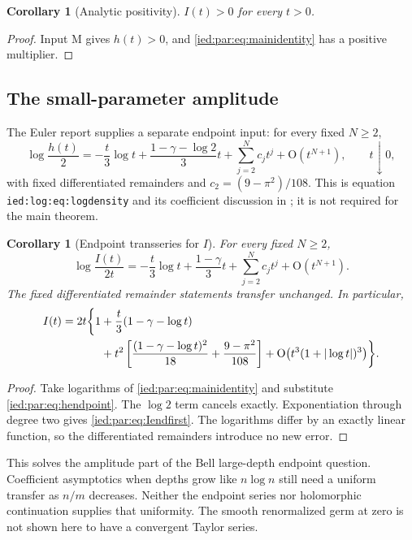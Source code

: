 \documentclass[11pt,letterpaper]{article}
\newtheorem{corollary}[theorem]{Corollary}
\theoremstyle{remark}\newtheorem{remark}[theorem]{Remark}
\newcommand{\Oh}{\mathrm O}\newcommand{\supp}{\operatorname{supp}}
\newcommand{\file}[1]{\nolinkurl{#1}}
\begin{document}
\begin{corollary}[Analytic positivity]\label{ied:par:cor:positive}
$I(t)>0$ for every $t>0$.
\end{corollary}
\begin{proof}
Input M gives $h(t)>0$, and \eqref{ied:par:eq:mainidentity} has a positive multiplier.
\end{proof}

\subsection{The small-parameter amplitude}
The Euler report supplies a separate endpoint input: for every fixed
$N\ge2$,
\begin{equation}\label{ied:par:eq:hendpoint}
 \log\frac{h(t)}2
 =-\frac t3\log t+\frac{1-\gamma-\log2}{3}t
 +\sum_{j=2}^N c_jt^j+\Oh(t^{N+1}),\qquad t\downarrow0,
\end{equation}
with fixed differentiated remainders and $c_2=(9-\pi^2)/108$.
This is equation \file{ied:log:eq:logdensity} and its coefficient
discussion in \cite{Euler}; it is not required for the main theorem.

\begin{corollary}[Endpoint transseries for $I$]\label{ied:par:cor:endpoint}
For every fixed $N\ge2$,
\begin{equation}\label{ied:par:eq:Iendpoint}
 \log\frac{I(t)}{2t}
 =-\frac t3\log t+\frac{1-\gamma}{3}t
 +\sum_{j=2}^N c_jt^j+\Oh(t^{N+1}).
\end{equation}
The fixed differentiated remainder statements transfer unchanged.
In particular,
\begin{align}
 I(t)=2t\bigg\{1
 &+\frac t3(1-\gamma-\log t)\notag\\
 &+t^2\left[
 \frac{(1-\gamma-\log t)^2}{18}
 +\frac{9-\pi^2}{108}\right]
 +\Oh\bigl(t^3(1+|\log t|)^3\bigr)\bigg\}.
 \label{ied:par:eq:Iendfirst}
\end{align}
\end{corollary}
\begin{proof}
Take logarithms of \eqref{ied:par:eq:mainidentity} and substitute
\eqref{ied:par:eq:hendpoint}. The $\log2$ term cancels exactly.
Exponentiation through degree two gives \eqref{ied:par:eq:Iendfirst}.
The logarithms differ by an exactly linear function, so the
differentiated remainders introduce no new error.
\end{proof}

This solves the amplitude part of the Bell large-depth endpoint
question. Coefficient asymptotics when depths grow like $n\log n$
still need a uniform transfer as $n/m$ decreases. Neither the endpoint
series nor holomorphic continuation supplies that uniformity.
The smooth renormalized germ at zero is not shown here to have a
convergent Taylor series.
\end{document}
